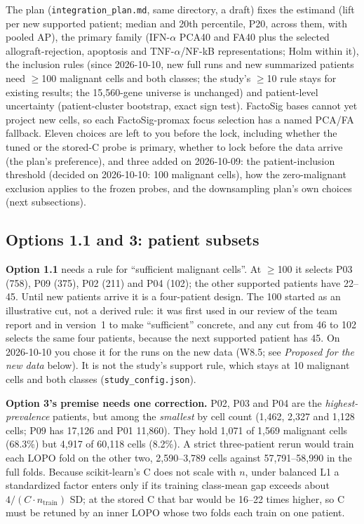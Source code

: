 The plan (\texttt{integration\_plan.md}, same directory, a draft) fixes the estimand (lift per new supported patient; median and 20th percentile, P20, across them, with pooled AP), the primary family (IFN-$\alpha$ PCA40 and FA40 plus the selected allograft-rejection, apoptosis and TNF-$\alpha$/NF-kB representations; Holm within it), the inclusion rules (since 2026-10-10, new full runs and new summarized patients need $\geq$100 malignant cells and both classes; the study's $\geq$10 rule stays for existing results; the 15,560-gene universe is unchanged) and patient-level uncertainty (patient-cluster bootstrap, exact sign test). FactoSig bases cannot yet project new cells, so each FactoSig-promax focus selection has a named PCA/FA fallback. Eleven choices are left to you before the lock, including whether the tuned or the stored-C probe is primary, whether to lock before the data arrive (the plan's preference), and three added on 2026-10-09: the patient-inclusion threshold (decided on 2026-10-10: 100 malignant cells), how the zero-malignant exclusion applies to the frozen probes, and the downsampling plan's own choices (next subsections).

\subsection{Options 1.1 and 3: patient subsets}

\textbf{Option 1.1} needs a rule for ``sufficient malignant cells''. At $\geq$100 it selects P03 (758), P09 (375), P02 (211) and P04 (102); the other supported patients have 22--45. Until new patients arrive it is a four-patient design. The 100 started as an illustrative cut, not a derived rule: it was first used in our review of the team report and in version~1 to make ``sufficient'' concrete, and any cut from 46 to 102 selects the same four patients, because the next supported patient has 45. On 2026-10-10 you chose it for the runs on the new data (W8.5; see \emph{Proposed for the new data} below). It is not the study's support rule, which stays at 10 malignant cells and both classes (\texttt{study\_config.json}).

\textbf{Option 3's premise needs one correction.} P02, P03 and P04 are the \emph{highest-prevalence} patients, but among the \emph{smallest} by cell count (1,462, 2,327 and 1,128 cells; P09 has 17,126 and P01 11,860). They hold 1,071 of 1,569 malignant cells (68.3\%) but 4,917 of 60,118 cells (8.2\%). A strict three-patient rerun would train each LOPO fold on the other two, 2,590--3,789 cells against 57,791--58,990 in the full folds. Because scikit-learn's C does not scale with $n$, under balanced L1 a standardized factor enters only if its training class-mean gap exceeds about $4/(C \cdot n_{\text{train}})$ SD; at the stored C that bar would be 16--22 times higher, so C must be retuned by an inner LOPO whose two folds each train on one patient.

